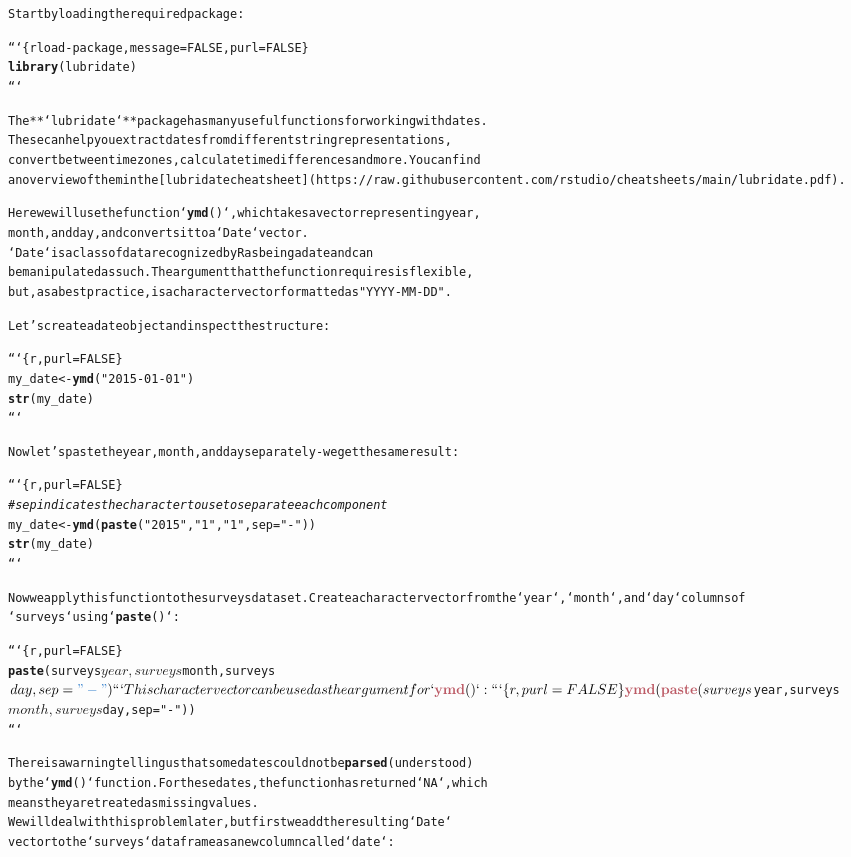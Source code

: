 \documentclass{article}\usepackage[]{graphicx}\usepackage[]{xcolor}
\makeatletter
\newcommand{\hlstr}[1]{\textcolor[rgb]{0.192,0.494,0.8}{#1}}%
\newcommand{\hlcom}[1]{\textcolor[rgb]{0.678,0.584,0.686}{\textit{#1}}}%
\newcommand{\hlkwd}[1]{\textcolor[rgb]{0.737,0.353,0.396}{\textbf{#1}}}%
\newenvironment{kframe}{%
 \def\at@end@of@kframe{}%
 \ifinner\ifhmode%
  \def\at@end@of@kframe{\end{minipage}}%
  \begin{minipage}{\columnwidth}%
 \fi\fi%
 \def\FrameCommand##1{\hskip\@totalleftmargin \hskip-\fboxsep
 \colorbox{shadecolor}{##1}\hskip-\fboxsep
     \hskip-\linewidth \hskip-\@totalleftmargin \hskip\columnwidth}%
 \MakeFramed {\advance\hsize-\width
   \@totalleftmargin\z@ \linewidth\hsize
   \@setminipage}}%
 {\par\unskip\endMakeFramed%
 \at@end@of@kframe}
\newenvironment{knitrout}{}{} %
\makeatother
\begin{document}
\begin{knitrout}
\begin{kframe}
\begin{alltt}
Start by loading the required package:

```\{r load-package, message=FALSE, purl=FALSE\}
\hlkwd{library}(lubridate)
```

The **`lubridate`** package has many useful functions for working with dates. 
These can help you extract dates from different string representations, 
convert between timezones, calculate time differences and more. You can find 
an overview of them in the [lubridate cheat sheet](https://raw.githubusercontent.com/rstudio/cheatsheets/main/lubridate.pdf).

Here we will use the function `\hlkwd{ymd}()`, which takes a vector representing year, 
month, and day, and converts it to a `Date` vector. 
`Date` is a class of data recognized by R as being a date and can
be manipulated as such. The argument that the function requires is flexible,
but, as a best practice, is a character vector formatted as \hlstr{"YYYY-MM-DD"}.

Let's create a date object and inspect the structure:

```\{r, purl=FALSE\}
my_date <- \hlkwd{ymd}(\hlstr{"2015-01-01"})
\hlkwd{str}(my_date)
```

Now let's paste the year, month, and day separately - we get the same result:

```\{r, purl=FALSE\}
\hlcom{# sep indicates the character to use to separate each component}
my_date <- \hlkwd{ymd}(\hlkwd{paste}(\hlstr{"2015"}, \hlstr{"1"}, \hlstr{"1"}, sep = \hlstr{"-"})) 
\hlkwd{str}(my_date)
```

Now we apply this function to the surveys dataset. Create a character vector from the `year`, `month`, and `day` columns of
`surveys` using `\hlkwd{paste}()`:

```\{r, purl=FALSE\}
\hlkwd{paste}(surveys$year, surveys$month, surveys$day, sep = \hlstr{"-"})
```

This character vector can be used as the argument for `\hlkwd{ymd}()`:

```\{r, purl=FALSE\}
\hlkwd{ymd}(\hlkwd{paste}(surveys$year, surveys$month, surveys$day, sep = \hlstr{"-"}))
```

There is a warning telling us that some dates could not be \hlkwd{parsed} (understood)
by the `\hlkwd{ymd}()` function. For these dates, the function has returned `NA`, which
means they are treated as missing values.
We will deal with this problem later, but first we add the resulting `Date`
vector to the `surveys` data frame as a new column called `date`:


\end{alltt}
\end{kframe}
\end{knitrout}
\end{document}
